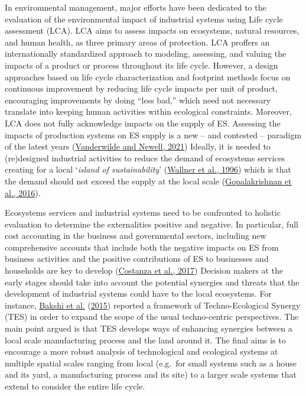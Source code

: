 \documentclass[]{elsarticle} %
\begin{document}
In environmental management, major efforts have been dedicated to the evaluation of the environmental impact of industrial systems using Life cycle assessment (LCA).
LCA aims to assess impacts on ecosystems, natural resources, and human health, as three primary areas of protection.
LCA proffers an internationally standardized approach to modeling, assessing, and valuing the impacts of a product or process throughout its life cycle.
However, a design approaches based on life cycle characterization and footprint methods focus on continuous improvement by reducing life cycle impacts per unit of product, encouraging improvements by doing ``less bad,'' which need not necessary translate into keeping human activities within ecological constraints.
Moreover, LCA does not fully acknowledge impacts on the supply of ES.
Assessing the impacts of production systems on ES supply is a new -- and contested -- paradigm of the latest years (\protect\hyperlink{ref-Vanderwilde2021}{Vanderwilde and Newell, 2021})
Ideally, it is needed to (re)designed industrial activities to reduce the demand of ecosystems services creating for a local `\emph{island of sustainability}' (\protect\hyperlink{ref-Wallner1996}{Wallner et al., 1996}) which is that the demand should not exceed the supply at the local scale (\protect\hyperlink{ref-Gopalakrishnan2016}{Gopalakrishnan et al., 2016}).

Ecosystems services and industrial systems need to be confronted to holistic evaluation to determine the externalities positive and negative.
In particular, full cost accounting in the business and governmental sectors, including new comprehensive accounts that include both the negative impacts on ES from business activities and the positive contributions of ES to businesses and households are key to develop (\protect\hyperlink{ref-Costanza2017}{Costanza et al., 2017})
Decision makers at the early stages should take into account the potential synergies and threats that the development of industrial systems could have to the local ecosystems.
For instance, \protect\hyperlink{ref-Bakshi2015}{Bakshi et al.} (\protect\hyperlink{ref-Bakshi2015}{2015}) reported a framework of Techno-Ecological Synergy (TES) in order to expand the scope of the usual techno-centric perspectives.
The main point argued is that TES develops ways of enhancing synergies between a local scale manufacturing process and the land around it.
The final aims is to encourage a more robust analysis of technological and ecological systems at multiple spatial scales ranging from local (e.g.~for small systems such as a house and its yard, a manufacturing process and its site) to a larger scale systems that extend to consider the entire life cycle.
\end{document}
